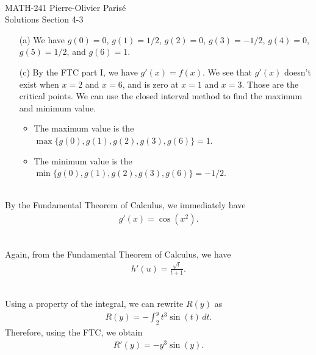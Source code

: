 


	\noindent \hrulefill \\
	MATH-241 \hfill Pierre-Olivier Paris{\'e}\\
	Solutions Section 4-3 \hfill \semester \\\vspace*{-1cm}
	
	\noindent\hrulefill
	
	\spc	
	
	\begin{enumerate}
	\item[(a)] We have $g(0) = 0$, $g(1) = 1/2$, $g(2) = 0$, $g(3) = -1/2$, $g(4) = 0$, $g(5) = 1/2$, and $g(6) = 1$.
	\item[(c)] By the FTC part I, we have $g'(x) = f(x)$. We see that $g'(x)$ doesn't exist when $x = 2$ and $x = 6$, and is zero at $x = 1$ and $x = 3$. Those are the critical points. We can use the closed interval method to find the maximum and minimum value.
		\begin{itemize}
		\item The maximum value is the $\max \{ g(0) , g(1) , g(2) , g(3) , g(6) \} = 1$.
		\item The minimum value is the $\min \{ g(0) , g(1) , g(2) , g(3) , g(6) \} = -1/2$.
		\end{itemize}
	\end{enumerate}
	
	\spc
	
	\\
	By the Fundamental Theorem of Calculus, we immediately have
		\begin{align*}
		g'(x) = \cos (x^2) .
		\end{align*}
		
	\spc
	
	\\
	Again, from the Fundamental Theorem of Calculus, we have
		\begin{align*}
		h'(u) = \frac{\sqrt{t}}{t + 1} .
		\end{align*}
		
	\spc
	
	\\
	Using a property of the integral, we can rewrite $R(y)$ as
		\begin{align*}
		R(y) = - \int_2^y t^3 \sin (t) \, dt .
		\end{align*}
	Therefore, using the FTC, we obtain
		\begin{align*}
		R'(y) = - y^3 \sin (y) .
		\end{align*}
		
